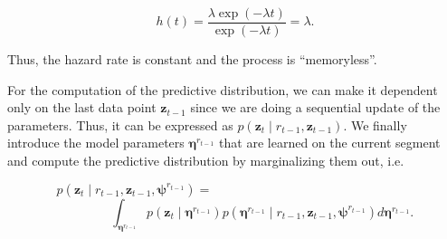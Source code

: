 \begin{equation}
\label{eqn:hazardexp}
h(t) = \frac{\lambda\exp(-\lambda t)}{\exp(-\lambda t)} = \lambda.
\end{equation}

Thus, the hazard rate is constant and the process is ``memoryless''.


For the computation of the predictive distribution, we can make it dependent
only on the last data point $\mathbf{z}_{t-1}$ since we are doing a sequential
update of the parameters. Thus, it can be expressed as $p(\mathbf{z}_t
\mid r_{t-1}, \mathbf{z}_{t-1})$. We finally
introduce the model parameters $\boldsymbol{\eta}^{r_{t-1}}$ that are learned
on the current segment and compute the predictive distribution by marginalizing
them out, i.e.

\begin{equation}
\label{eqn:preddistr}
p(\mathbf{z}_t\mid r_{t-1},\mathbf{z}_{t-1},\boldsymbol{\psi}^{r_{t-1}})
= \phantom{aaaaaaaaaaaaaaaaaaaaaaaaaaaaaa}\nonumber
\end{equation}
\begin{equation}
 \phantom{aaaaaaaa}\int_{\boldsymbol{\eta}^{r_{t-1}}}
p(\mathbf{z}_t\mid\boldsymbol{\eta}^{r_{t-1}})p(\boldsymbol{\eta}^{r_{t-1}}\mid
r_{t-1},\mathbf{z}_{t-1},\boldsymbol{\psi}^{r_{t-1}})
d\boldsymbol{\eta}^{r_{t-1}}.
\end{equation}


